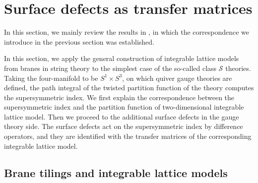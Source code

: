 





\newcommand{\fundbox}{\tikz{\node[fnode, semithick, minimum size=8pt] {}}}


\section{Surface defects as transfer matrices}

In this section, we mainly review the results in \cite{Maruyoshi:2016caf}, 
in which the correspondence we introduce in the previous section was established. 


In this section, we apply the general construction of integrable lattice
models from branes in string theory to the simplest case of the so-called
class $\mathcal{S}$ theories. Taking the four-manifold to be $S^{1} \times S^{3}$,
on which quiver gauge theories are defined, the path integral of the
twisted partition function of the theory computes the supersymmetric
index. We first explain the correspondence between the supersymmetric
index and the partition function of two-dimensional integrable lattice
model. Then we proceed to the additional surface defects in the gauge
theory side. The surface defects act on the supersymmetric index by
difference operators, and they are identified with the transfer matrices
of the corresponding integrable lattice model. 





\subsection{Brane tilings and integrable lattice models}

